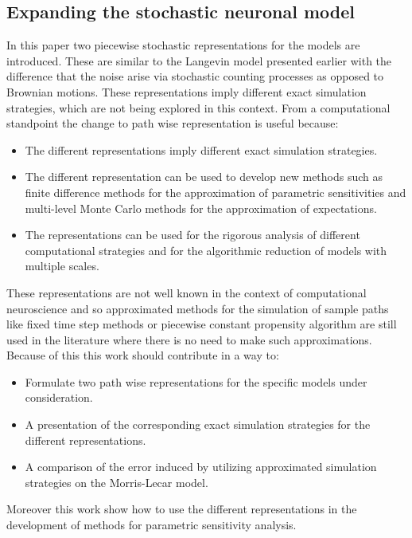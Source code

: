 	\subsection{Expanding the stochastic neuronal model}
	In this paper two piecewise stochastic representations for the models are introduced.
	These are similar to the Langevin model presented earlier with the difference that the noise arise via stochastic counting processes as opposed to Brownian motions.
	These representations imply different exact simulation strategies, which are not being explored in this context.
	From a computational standpoint the change to path wise representation is useful because:

	\begin{itemize}
		\item The different representations imply different exact simulation strategies.
		\item The different representation can be used to develop new methods such as finite difference methods for the approximation of parametric sensitivities and multi-level Monte Carlo methods for the approximation of expectations.
		\item The representations can be used for the rigorous analysis of different computational strategies and for the algorithmic reduction of models with multiple scales.
	\end{itemize}

	These representations are not well known in the context of computational neuroscience and so approximated methods for the simulation of sample paths like fixed time step methods or piecewise constant propensity algorithm are still used in the literature where there is no need to make such approximations.
	Because of this this work should contribute in a way to:

	\begin{itemize}
		\item Formulate two path wise representations for the specific models under consideration.
		\item A presentation of the corresponding exact simulation strategies for the different representations.
		\item A comparison of the error induced by utilizing approximated simulation strategies on the Morris-Lecar model.
	\end{itemize}

	Moreover this work show how to use the different representations in the development of methods for parametric sensitivity analysis.
